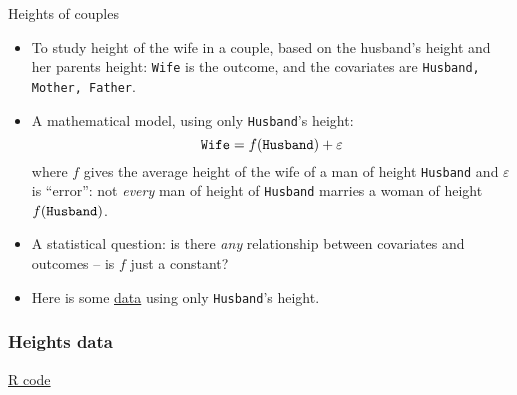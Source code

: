 \documentclass[handout]{beamer}
\begin{document}

   \begin{frame} 

   \begin{block}{Heights of couples}
   \begin{itemize}

   \item To study height of the wife in a couple, based on the
   husband's height and her parents height: {\tt Wife} is the
   outcome, and the covariates are {\tt Husband, Mother, Father}.


   \item A mathematical  model, using only {\tt Husband}'s height:
   $$
   {\tt Wife} = f({\tt Husband}) + \varepsilon$$
   where $f$ gives the average height of the wife
   of a man of height {\tt Husband} and
   $\varepsilon$ is ``error'': not {\em every} man of height of
   {\tt Husband} marries
   a woman of height $f({\tt Husband})$.

   \item A statistical question: is there {\em any}
   relationship between covariates and outcomes -- is $f$ just a constant?

   \item Here is some  \href{http://stats191.stanford.edu/review.html}{data}
   using only {\tt Husband}'s height.
   \end{itemize}

   \end{block}
   \end{frame}



   \begin{frame}
   \frametitle{Heights data}
   \begin{center}
   \end{center}
   \href{http://stats191.stanford.edu/review.html}{R code}
   \end{frame}
\end{document}
